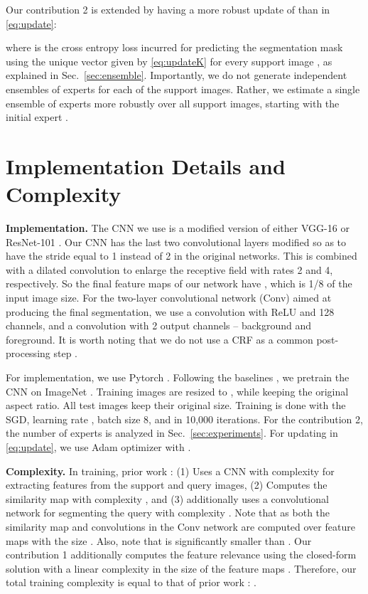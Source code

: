 \documentclass[10pt,twocolumn,letterpaper]{article}
\begin{document}
Our contribution 2 is extended by having a more robust update of  than in \eqref{eq:update}:

where  is the cross entropy loss incurred for predicting the segmentation mask  using the  unique vector  given by \eqref{eq:updateK} for every support image , as explained in Sec.~\ref{sec:ensemble}. Importantly, we do not generate   independent ensembles of experts  for each of the  support images. Rather, we estimate a single ensemble of experts more robustly over all  support images, starting with the initial expert . 

\section{Implementation Details and Complexity}
\label{sec:implement}
{\bf Implementation.} The CNN we use  is a modified version of either VGG-16 \cite{simonyan2014deep} or ResNet-101 \cite{he2015deep}. 
Our CNN has  the last two convolutional layers modified so as to have the stride equal to 1 instead of 2 in the original networks. This is combined with a dilated convolution to enlarge the receptive field with rates 2 and 4, respectively. So the final feature maps of our network have , which is 1/8 of the input image size. For the two-layer convolutional network (Conv)  aimed at producing the final segmentation, we use a  convolution with ReLU  and 128 channels, and a  convolution with 2 output channels -- background and foreground. It is worth noting that we do not use a CRF  as a common post-processing step \cite{krhenbhl2012efficient}. 

For implementation, we use Pytorch   \cite{paszke2017automatic}. Following the baselines \cite{zhang2018sgone,rakelly2018conditional,rakelly2018fewshot}, we pretrain the CNN on ImageNet \cite{ILSVRC15}. Training images are resized to , while keeping the original aspect ratio. All test images keep their original size. Training is done with the SGD, learning rate , batch size  8,  and in 10,000 iterations.    For the contribution 2, the number of experts  is analyzed in Sec.~\ref{sec:experiments}. For updating  in \eqref{eq:update},  we use Adam optimizer \cite{kingma2014adam} with   . 


{\bf  Complexity.} 
In training, prior work \cite{zhang2018sgone,rakelly2018conditional,rakelly2018fewshot}: (1) Uses a CNN with complexity  for extracting features from the support and query images, (2) Computes the similarity map with  complexity , and (3) \cite{zhang2018sgone} additionally uses a convolutional network for segmenting the query with  complexity . Note that   as both the similarity map and convolutions in the Conv network are computed over feature maps with the size . Also, note that  is significantly smaller than . Our contribution 1 additionally computes the feature relevance using the closed-form solution with a linear complexity in the size of the feature maps  . Therefore, our total training complexity is equal to that of prior work \cite{zhang2018sgone,rakelly2018conditional,rakelly2018fewshot}: .
\end{document}
